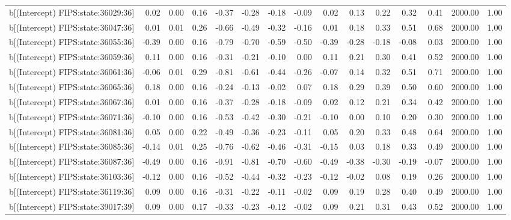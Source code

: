 \begin{table}[ht]
\begin{tabular}{rrrrrrrrrrrrrrr}
  b[(Intercept) FIPS:state:36029:36] & 0.02 & 0.00 & 0.16 & -0.37 & -0.28 & -0.18 & -0.09 & 0.02 & 0.13 & 0.22 & 0.32 & 0.41 & 2000.00 & 1.00 \\ 
  b[(Intercept) FIPS:state:36047:36] & 0.01 & 0.01 & 0.26 & -0.66 & -0.49 & -0.32 & -0.16 & 0.01 & 0.18 & 0.33 & 0.51 & 0.68 & 2000.00 & 1.00 \\ 
  b[(Intercept) FIPS:state:36055:36] & -0.39 & 0.00 & 0.16 & -0.79 & -0.70 & -0.59 & -0.50 & -0.39 & -0.28 & -0.18 & -0.08 & 0.03 & 2000.00 & 1.00 \\ 
  b[(Intercept) FIPS:state:36059:36] & 0.11 & 0.00 & 0.16 & -0.31 & -0.21 & -0.10 & 0.00 & 0.11 & 0.21 & 0.30 & 0.41 & 0.52 & 2000.00 & 1.00 \\ 
  b[(Intercept) FIPS:state:36061:36] & -0.06 & 0.01 & 0.29 & -0.81 & -0.61 & -0.44 & -0.26 & -0.07 & 0.14 & 0.32 & 0.51 & 0.71 & 2000.00 & 1.00 \\ 
  b[(Intercept) FIPS:state:36065:36] & 0.18 & 0.00 & 0.16 & -0.24 & -0.13 & -0.02 & 0.07 & 0.18 & 0.29 & 0.39 & 0.50 & 0.60 & 2000.00 & 1.00 \\ 
  b[(Intercept) FIPS:state:36067:36] & 0.01 & 0.00 & 0.16 & -0.37 & -0.28 & -0.18 & -0.09 & 0.02 & 0.12 & 0.21 & 0.34 & 0.42 & 2000.00 & 1.00 \\ 
  b[(Intercept) FIPS:state:36071:36] & -0.10 & 0.00 & 0.16 & -0.53 & -0.42 & -0.30 & -0.21 & -0.10 & 0.00 & 0.10 & 0.20 & 0.30 & 2000.00 & 1.00 \\ 
  b[(Intercept) FIPS:state:36081:36] & 0.05 & 0.00 & 0.22 & -0.49 & -0.36 & -0.23 & -0.11 & 0.05 & 0.20 & 0.33 & 0.48 & 0.64 & 2000.00 & 1.00 \\ 
  b[(Intercept) FIPS:state:36085:36] & -0.14 & 0.01 & 0.25 & -0.76 & -0.62 & -0.46 & -0.31 & -0.15 & 0.03 & 0.18 & 0.33 & 0.49 & 2000.00 & 1.00 \\ 
  b[(Intercept) FIPS:state:36087:36] & -0.49 & 0.00 & 0.16 & -0.91 & -0.81 & -0.70 & -0.60 & -0.49 & -0.38 & -0.30 & -0.19 & -0.07 & 2000.00 & 1.00 \\ 
  b[(Intercept) FIPS:state:36103:36] & -0.12 & 0.00 & 0.16 & -0.52 & -0.44 & -0.32 & -0.23 & -0.12 & -0.02 & 0.08 & 0.19 & 0.26 & 2000.00 & 1.00 \\ 
  b[(Intercept) FIPS:state:36119:36] & 0.09 & 0.00 & 0.16 & -0.31 & -0.22 & -0.11 & -0.02 & 0.09 & 0.19 & 0.28 & 0.40 & 0.49 & 2000.00 & 1.00 \\ 
  b[(Intercept) FIPS:state:39017:39] & 0.09 & 0.00 & 0.17 & -0.33 & -0.23 & -0.12 & -0.02 & 0.09 & 0.21 & 0.31 & 0.43 & 0.52 & 2000.00 & 1.00 \\ 

\end{tabular}
\end{table}
